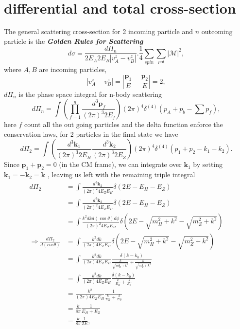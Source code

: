 \documentclass{report}
\newcommand{\nn}{\nonumber}
\numberwithin{equation}{section}
\begin{document}
\section{differential and total cross-section}
The general scattering cross-section for 2 incoming particle and $n$ outcoming particle is the \textbf{\textit{Golden Rules for Scattering}} 
\begin{equation}
d\sigma=\frac{d\Pi_n}{2E_A2E_B|v_A^z-v_B^z|}.\frac{1}{4}\sum_{spin} \sum_{pol} |\mathcal{M}|^2,\label{18}
\end{equation}
where $A,B$ are incoming particles,
\begin{equation}
|v_A^z-v_B^z|=|\frac{\textbf{p}_1}{E}-\frac{\textbf{p}_2}{E}|=2,
\end{equation}
$d\Pi_n$ is the phase space integral for n-body scattering 
\begin{equation}
d\Pi_n=\int \left(\prod_{f=1}^n\frac{d^3\textbf{p}_f}{(2\pi)^3 2E_f}\right)(2\pi)^4\delta^{(4)}\left(p_A+p_b-\sum p_f\right),
\end{equation}
here $f$ count all the out going particles and the delta function enforce the conservation laws, for 2 particles in the final state we have
\begin{equation}
d\Pi_2=\int \left(\frac{d^3\textbf{k}_1}{(2\pi)^3 2E_H}\frac{d^3\textbf{k}_2}{(2\pi)^3 2E_Z}\right)(2\pi)^4\delta^{(4)}\left(p_1+p_2-k_1-k_2\right).
\end{equation}
Since $\textbf{p}_1+\textbf{p}_2=0$ (in the CM frame), we can integrate over $\textbf{k}_1$ by setting
$\textbf{k}_1=-\textbf{k}_2=\textbf{k}$ , leaving us left with the remaining triple integral
\begin{align}
d\Pi_2&=\int \frac{d^3\textbf{k}_2}{(2\pi)^2 4E_Z E_H}\delta\left(2E-E_H-E_Z\right)\nonumber\\
&=\int \frac{d^3\textbf{k}_2}{(2\pi)^2 4E_Z E_H}\delta\left(2E-E_H-E_Z\right)\nonumber\\
&=\int \frac{k^2 dk d(\cos\theta) d\phi}{(2\pi)^2 4E_Z E_H}\delta\left(2E-\sqrt{m_H^2+k^2}-\sqrt{m_Z^2+k^2}\right)\nonumber\\
\Rightarrow \frac{d\Pi_2}{d(cos\theta)}&=\int \frac{k^2 dk}{(2\pi) 4E_Z E_H}\delta\left(2E-\sqrt{m_H^2+k^2}-\sqrt{m_Z^2+k^2}\right)\nonumber\\
&=\int \frac{k^2 dk}{(2\pi) 4E_Z E_H}\frac{\delta\left(k-k_{0}\right)}{\frac{k}{\sqrt{m_H^2+k^2}}+\frac{k}{\sqrt{m_Z^2+k^2}}}\nonumber\\
&=\int \frac{k^2 dk}{(2\pi) 4E_Z E_H}\frac{\delta\left(k-k_{0}\right)}{\frac{k}{E_H}+\frac{k}{E_Z}}\nonumber\\
&=\frac{k^2}{(2\pi) 4E_Z E_H}\frac{1}{\frac{k}{E_H}+\frac{k}{E_Z}}\nn\\
&=\frac{k}{8\pi}\frac{1}{E_H+E_Z}\nn\\
&=\frac{k}{8\pi}\frac{1}{2E},
\label{17}
\end{align}
\end{document}
